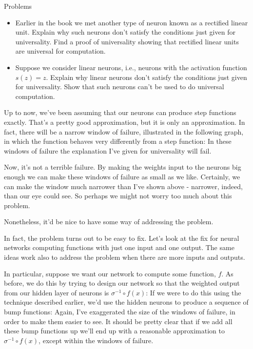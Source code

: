 \begin{exerciseBox}{Problems}


\begin{itemize}

\item Earlier in the book we met another type of neuron known as a rectified linear unit. Explain why such neurons don't satisfy the conditions just given for universality. Find a proof of universality showing that rectified linear units are universal for computation.

\item Suppose we consider linear neurons, i.e., neurons with the activation function $s(z) = z$. Explain why linear neurons don't satisfy the conditions just given for universality. Show that such neurons can't be used to do universal computation.

\end{itemize}

\end{exerciseBox}





Up to now, we've been assuming that our neurons can produce step functions exactly. That's a pretty good approximation, but it is only an approximation. In fact, there will be a narrow window of failure, illustrated in the following graph, in which the function behaves very differently from a step function: In these windows of failure the explanation I've given for universality will fail.


Now, it's not a terrible failure. By making the weights input to the neurons big enough we can make these windows of failure as small as we like. Certainly, we can make the window much narrower than I've shown above - narrower, indeed, than our eye could see. So perhaps we might not worry too much about this problem.


Nonetheless, it'd be nice to have some way of addressing the problem.


In fact, the problem turns out to be easy to fix. Let's look at the fix for neural networks computing functions with just one input and one output. The same ideas work also to address the problem when there are more inputs and outputs.


In particular, suppose we want our network to compute some function, $f$. As before, we do this by trying to design our network so that the weighted output from our hidden layer of neurons is $\sigma^{-1} \circ f(x)$: If we were to do this using the technique described earlier, we'd use the hidden neurons to produce a sequence of bump functions: Again, I've exaggerated the size of the windows of failure, in order to make them easier to see. It should be pretty clear that if we add all these bump functions up we'll end up with a reasonable approximation to $\sigma^{-1} \circ f(x)$, except within the windows of failure.


